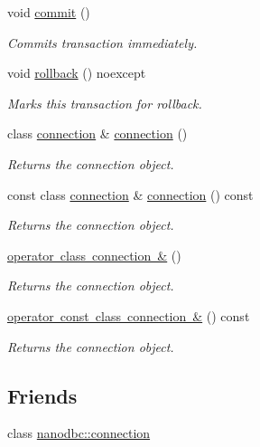 \begin{DoxyCompactItemize}
void \mbox{\hyperlink{classnanodbc_1_1transaction_ad13c6871ac5f572456e881c2e52c2c91}{commit}} ()
\begin{DoxyCompactList}\small\item\em Commits transaction immediately. \end{DoxyCompactList}\item 
void \mbox{\hyperlink{classnanodbc_1_1transaction_a078907315633af2569fc3bbcc70461e8}{rollback}} () noexcept
\begin{DoxyCompactList}\small\item\em Marks this transaction for rollback. \end{DoxyCompactList}\item 
class \mbox{\hyperlink{classnanodbc_1_1connection}{connection}} \& \mbox{\hyperlink{classnanodbc_1_1transaction_a6192b685fe9f0046b706b3feb874a957}{connection}} ()
\begin{DoxyCompactList}\small\item\em Returns the connection object. \end{DoxyCompactList}\item 
const class \mbox{\hyperlink{classnanodbc_1_1connection}{connection}} \& \mbox{\hyperlink{classnanodbc_1_1transaction_aa6233170b92702e6d86cec9aed557a25}{connection}} () const
\begin{DoxyCompactList}\small\item\em Returns the connection object. \end{DoxyCompactList}\item 
\mbox{\hyperlink{classnanodbc_1_1transaction_a8492d86e1c09aac1c76c12a0621e8b5a}{operator class connection \&}} ()
\begin{DoxyCompactList}\small\item\em Returns the connection object. \end{DoxyCompactList}\item 
\mbox{\hyperlink{classnanodbc_1_1transaction_ae2f6e59ea672314d66b5107f55b91e24}{operator const class connection \&}} () const
\begin{DoxyCompactList}\small\item\em Returns the connection object. \end{DoxyCompactList}\end{DoxyCompactItemize}
\subsection*{Friends}
\begin{DoxyCompactItemize}
\item 
class \mbox{\hyperlink{classnanodbc_1_1transaction_a0b889d1aff4853b8d941bad4f0e1e9fc}{nanodbc\+::connection}}
\end{DoxyCompactItemize}


